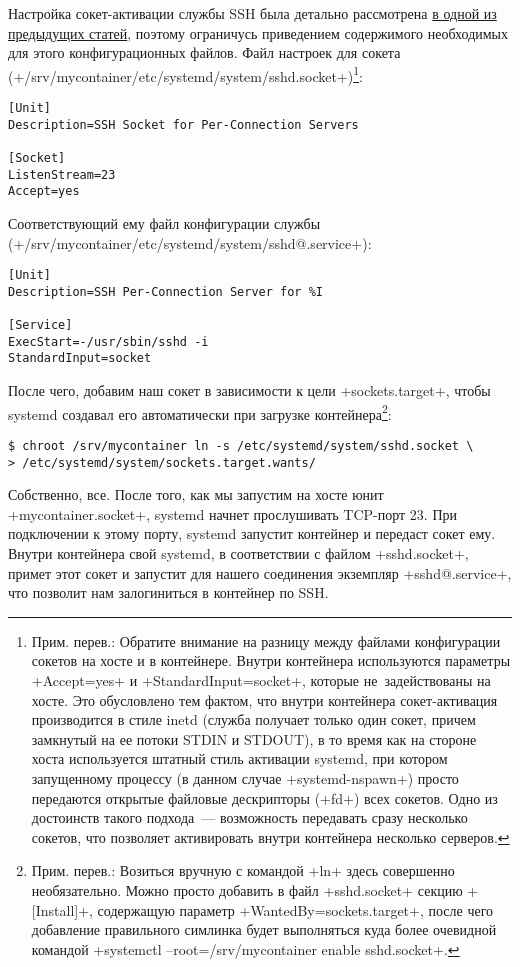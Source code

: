 \documentclass[10pt,oneside,a4paper]{article}
\begin{document}
Настройка сокет-активации службы SSH была детально рассмотрена 
\hyperref[sec:inetd]{в одной из предыдущих статей}, поэтому ограничусь
приведением содержимого необходимых для этого конфигурационных файлов. Файл
настроек для сокета
(+/srv/mycontainer/etc/systemd/system/sshd.socket+)\footnote{Прим. перев.:
Обратите внимание на разницу между файлами конфигурации сокетов на хосте и
в контейнере. Внутри контейнера используются параметры +Accept=yes+ и
+StandardInput=socket+, которые не~задействованы на хосте. Это обусловлено тем
фактом, что внутри контейнера сокет-активация производится в стиле inetd (служба
получает только один сокет, причем замкнутый на ее потоки STDIN и STDOUT), в то
время как на стороне хоста используется штатный стиль активации systemd, при
котором запущенному процессу (в данном случае +systemd-nspawn+) просто
передаются открытые файловые дескрипторы (+fd+) всех сокетов. Одно из достоинств
такого подхода~--- возможность передавать сразу несколько сокетов, что позволяет
активировать внутри контейнера несколько серверов.}:
\begin{Verbatim}
[Unit]
Description=SSH Socket for Per-Connection Servers

[Socket]
ListenStream=23
Accept=yes
\end{Verbatim}

Соответствующий ему файл конфигурации службы \\
(+/srv/mycontainer/etc/systemd/system/sshd@.service+):
\begin{Verbatim}
[Unit]
Description=SSH Per-Connection Server for %I

[Service]
ExecStart=-/usr/sbin/sshd -i
StandardInput=socket
\end{Verbatim}

После чего, добавим наш сокет в зависимости к цели +sockets.target+, чтобы
systemd создавал его автоматически при загрузке контейнера\footnote{Прим.
перев.: Возиться вручную с командой +ln+ здесь совершенно необязательно. Можно
просто добавить в файл +sshd.socket+ секцию +[Install]+, содержащую параметр
+WantedBy=sockets.target+, после чего добавление правильного симлинка будет
выполняться куда более очевидной командой
+systemctl --root=/srv/mycontainer enable sshd.socket+.}:
\begin{Verbatim}
$ chroot /srv/mycontainer ln -s /etc/systemd/system/sshd.socket \
> /etc/systemd/system/sockets.target.wants/
\end{Verbatim}

Собственно, все. После того, как мы запустим на хосте юнит +mycontainer.socket+,
systemd начнет прослушивать TCP-порт 23. При подключении к этому порту, systemd
запустит контейнер и передаст сокет ему. Внутри контейнера свой systemd, в
соответствии с файлом +sshd.socket+, примет этот сокет и запустит для нашего
соединения экземпляр +sshd@.service+, что позволит нам залогиниться в контейнер
по SSH.
\end{document}
